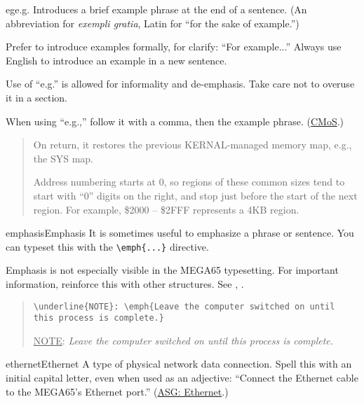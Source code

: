 \begin{sgentry}{eg}{e.g.}
    Introduces a brief example phrase at the end of a sentence. (An abbreviation for \emph{exempli gratia}, Latin for ``for the sake of example.'')

    Prefer to introduce examples formally, for clarify: ``For example...'' Always use English to introduce an example in a new sentence.

    Use of ``e.g.'' is allowed for informality and de-emphasis. Take care not to overuse it in a section.

    When using ``e.g.,'' follow it with a comma, then the example phrase. (\href{https://www.chicagomanualofstyle.org/qanda/data/faq/topics/Abbreviations/faq0047.html}{CMoS}.)

    \begin{quote}
        On return, it restores the previous KERNAL-managed memory map, e.g., the SYS map.

        Address numbering starts at 0, so regions of these common sizes tend to start with ``0'' digits on the right, and stop just before the start of the next region. For example, \$2000 -- \$2FFF represents a 4KB region.
    \end{quote}
\end{sgentry}

\begin{sgentry}{emphasis}{Emphasis}
    It is sometimes useful to emphasize a phrase or sentence. You can typeset this with the \texttt{{\textbackslash}emph\{...\}} directive.

    Emphasis is not especially visible in the MEGA65 typesetting. For important information, reinforce this with other structures. See , .

    \begin{quote}
        \texttt{{\textbackslash}underline\{NOTE\}: {\textbackslash}emph\{Leave the computer switched on until this process is complete.\}}

        \hrulefill

        \underline{NOTE}: \emph{Leave the computer switched on until this process is complete.}
    \end{quote}
\end{sgentry}

\begin{sgentry}{ethernet}{Ethernet}
    A type of physical network data connection. Spell this with an initial capital letter, even when used as an adjective: ``Connect the Ethernet cable to the MEGA65's Ethernet port.'' (\href{https://support.apple.com/en-my/guide/applestyleguide/apsg076a7313/web}{ASG: Ethernet}.)
\end{sgentry}

